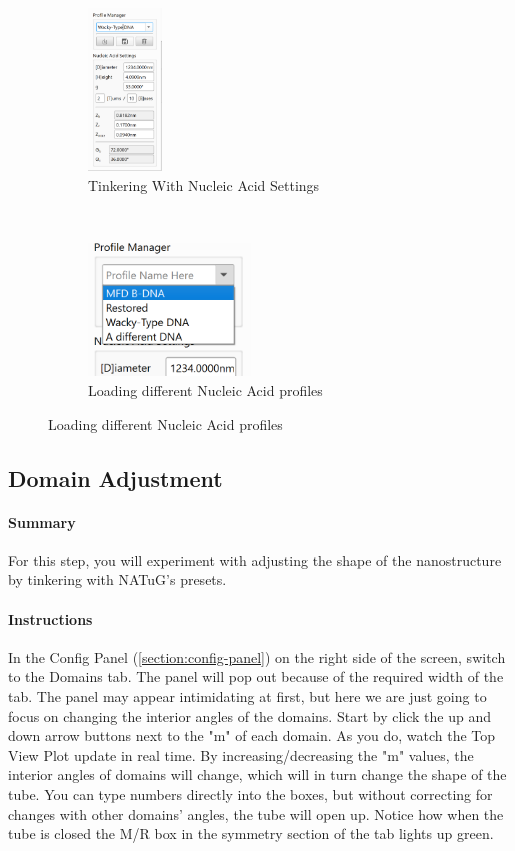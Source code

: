 \documentclass[
titlepage,
fontsize=12pt
]{article}
\begin{document}
	\begin{figure}[h]
		\caption{Experimenting with Nucleic Acid settings}
		\centering
		\begin{subfigure}{.5\textwidth}
			\centering
			\includegraphics[height=1.7in]{nucleic-acid-tinkering.png}
			\caption{Tinkering With Nucleic Acid Settings}
		\end{subfigure}%
		~
		\begin{subfigure}{.5\textwidth}
			\centering
			\includegraphics[width=1.7in]{nucleic-acid-tinkering-2.png}
			\caption{Loading different Nucleic Acid profiles}
		\end{subfigure}
	\end{figure}
	
	\subsection{Domain Adjustment}
	
	\paragraph{Summary} For this step, you will experiment with adjusting the shape of the nanostructure by tinkering with NATuG's presets.
	
	\paragraph{Instructions} In the Config Panel (\ref{section:config-panel}) on the right side of the screen, switch to the Domains tab. The panel will pop out because of the required width of the tab. The panel may appear intimidating at first, but here we are just going to focus on changing the interior angles of the domains. Start by click the up and down arrow buttons next to the "m" of each domain. As you do, watch the Top View Plot update in real time. By increasing/decreasing the "m" values, the interior angles of domains will change, which will in turn change the shape of the tube. You can type numbers directly into the boxes, but without correcting for changes with other domains' angles, the tube will open up. Notice how when the tube is closed the M/R box in the symmetry section of the tab lights up green.
	
\end{document}
